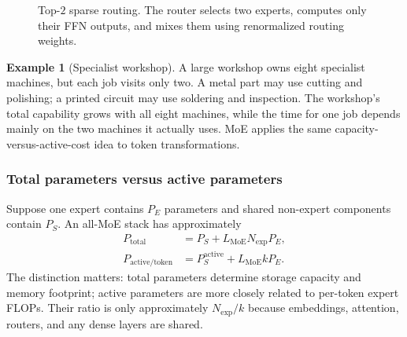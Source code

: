 \documentclass[11pt,a4paper]{article}
\theoremstyle{definition}
\newtheorem{example}{Example}[section]
\theoremstyle{plain}
\newcommand{\vx}{\bm{x}}
\begin{document}
\begin{figure}[H]
\centering
{}
\caption{Top-$2$ sparse routing. The router selects two experts, computes only their FFN outputs, and mixes them using renormalized routing weights.}
\label{fig:moe-routing}
\end{figure}

\begin{example}[Specialist workshop]
A large workshop owns eight specialist machines, but each job visits only two. A metal part may use cutting and polishing; a printed circuit may use soldering and inspection. The workshop's total capability grows with all eight machines, while the time for one job depends mainly on the two machines it actually uses. MoE applies the same capacity-versus-active-cost idea to token transformations.
\end{example}

\subsubsection{Total parameters versus active parameters}

Suppose one expert contains $P_E$ parameters and shared non-expert components contain $P_S$. An all-MoE stack has approximately
\begin{align}
    P_{\mathrm{total}}&=P_S+L_{\mathrm{MoE}}N_{\mathrm{exp}}P_E,\\
    P_{\mathrm{active/token}}&=P_S^{\mathrm{active}}+L_{\mathrm{MoE}}kP_E.
\end{align}
The distinction matters: total parameters determine storage capacity and memory footprint; active parameters are more closely related to per-token expert FLOPs. Their ratio is only approximately $N_{\mathrm{exp}}/k$ because embeddings, attention, routers, and any dense layers are shared.
\end{document}
